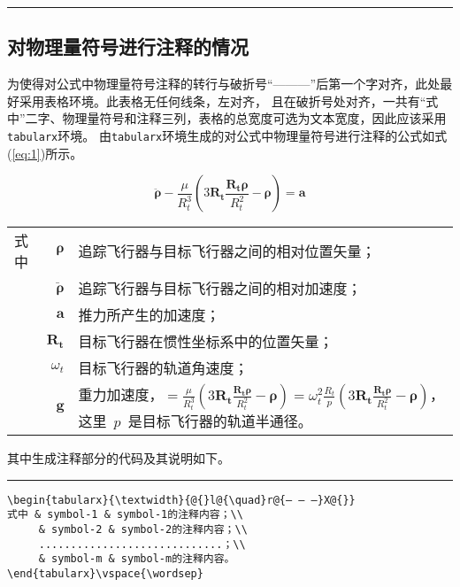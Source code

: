 \noindent\hrule
\subsection{对物理量符号进行注释的情况}
为使得对公式中物理量符号注释的转行与破折号“———”后第一个字对齐，此处最好采用表格环境。此表格无任何线条，左对齐，
且在破折号处对齐，一共有“式中”二字、物理量符号和注释三列，表格的总宽度可选为文本宽度，因此应该采用\verb|tabularx|环境。
由\verb|tabularx|环境生成的对公式中物理量符号进行注释的公式如式(\ref{eq:1})所示。

\begin{equation}\label{eq:1}
\ddot{\boldsymbol{\rho}}-\frac{\mu}{R_{t}^{3}}\left(3\mathbf{R_{t}}\frac{\mathbf{R_{t}\rho}}{R_{t}^{2}}-\boldsymbol{\rho}\right)=\mathbf{a}
\end{equation}

\begin{tabularx}{\textwidth}{@{}l@{\quad}r@{———}X@{}}
式中& $\bm{\rho}$ &追踪飞行器与目标飞行器之间的相对位置矢量；\\
&  $\bm{\ddot{\rho}}$&追踪飞行器与目标飞行器之间的相对加速度；\\
&  $\mathbf{a}$   &推力所产生的加速度；\\
&  $\mathbf{R_t}$ & 目标飞行器在惯性坐标系中的位置矢量；\\
&  $\omega_{t}$ & 目标飞行器的轨道角速度；\\
&  $\mathbf{g}$ & 重力加速度，$=\frac{\mu}{R_{t}^{3}}\left(
3\mathbf{R_{t}}\frac{\mathbf{R_{t}\rho}}{R_{t}^{2}}-\bm{\rho}\right)=\omega_{t}^{2}\frac{R_{t}}{p}\left(
3\mathbf{R_{t}}\frac{\mathbf{R_{t}\rho}}{R_{t}^{2}}-\bm{\rho}\right)$，这里~$p$~是目标飞行器的轨道半通径。
\end{tabularx}
\vspace{\wordsep}

其中生成注释部分的代码及其说明如下。

\vspace{1em}\noindent\hrule

\begin{verbatim}
\begin{tabularx}{\textwidth}{@{}l@{\quad}r@{— — —}X@{}}
式中 & symbol-1 & symbol-1的注释内容；\\
     & symbol-2 & symbol-2的注释内容；\\
     .............................；\\
     & symbol-m & symbol-m的注释内容。
\end{tabularx}\vspace{\wordsep}
\end{verbatim}

